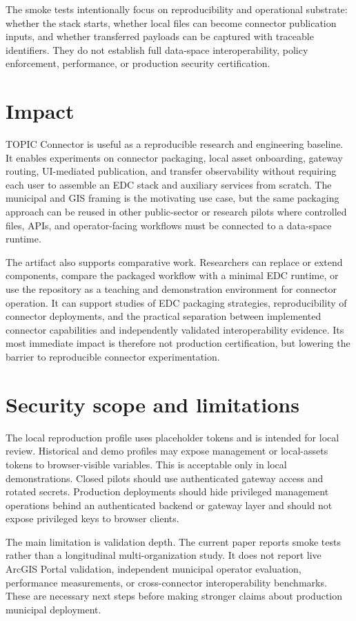 \documentclass[preprint,12pt]{elsarticle}
\begin{document}
The smoke tests intentionally focus on reproducibility and operational substrate: whether the stack starts, whether local files can become connector publication inputs, and whether transferred payloads can be captured with traceable identifiers. They do not establish full data-space interoperability, policy enforcement, performance, or production security certification.

\section{Impact}
TOPIC Connector is useful as a reproducible research and engineering baseline. It enables experiments on connector packaging, local asset onboarding, gateway routing, UI-mediated publication, and transfer observability without requiring each user to assemble an EDC stack and auxiliary services from scratch. The municipal and GIS framing is the motivating use case, but the same packaging approach can be reused in other public-sector or research pilots where controlled files, APIs, and operator-facing workflows must be connected to a data-space runtime.

The artifact also supports comparative work. Researchers can replace or extend components, compare the packaged workflow with a minimal EDC runtime, or use the repository as a teaching and demonstration environment for connector operation. It can support studies of EDC packaging strategies, reproducibility of connector deployments, and the practical separation between implemented connector capabilities and independently validated interoperability evidence. Its most immediate impact is therefore not production certification, but lowering the barrier to reproducible connector experimentation.

\section{Security scope and limitations}
The local reproduction profile uses placeholder tokens and is intended for local review. Historical and demo profiles may expose management or local-assets tokens to browser-visible variables. This is acceptable only in local demonstrations. Closed pilots should use authenticated gateway access and rotated secrets. Production deployments should hide privileged management operations behind an authenticated backend or gateway layer and should not expose privileged keys to browser clients.

The main limitation is validation depth. The current paper reports smoke tests rather than a longitudinal multi-organization study. It does not report live ArcGIS Portal validation, independent municipal operator evaluation, performance measurements, or cross-connector interoperability benchmarks. These are necessary next steps before making stronger claims about production municipal deployment.
\end{document}
